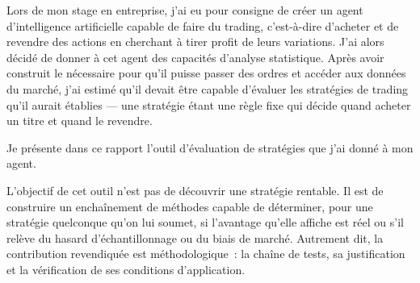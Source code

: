 %
%
%




Lors de mon stage en entreprise, j'ai eu pour consigne de créer un agent
d'intelligence artificielle capable de faire du trading, c'est-à-dire
d'acheter et de revendre des actions en cherchant à tirer profit de leurs
variations. J'ai alors décidé de donner à cet agent des capacités
d'analyse statistique. Après avoir construit le nécessaire pour qu'il
puisse passer des ordres et accéder aux données du marché, j'ai estimé
qu'il devait être capable d'évaluer les stratégies de trading qu'il
aurait établies — une stratégie étant une règle fixe qui décide quand
acheter un titre et quand le revendre.

Je présente dans ce rapport l'outil d'évaluation de stratégies que j'ai
donné à mon agent.

L'objectif de cet outil n'est pas de découvrir une stratégie rentable.
Il est de construire un enchaînement de méthodes capable de déterminer,
pour une stratégie quelconque qu'on lui soumet, si l'avantage qu'elle
affiche est réel ou s'il relève du hasard d'échantillonnage ou du biais
de marché. Autrement dit, la contribution revendiquée est
méthodologique~: la chaîne de tests, sa justification et la vérification
de ses conditions d'application.

